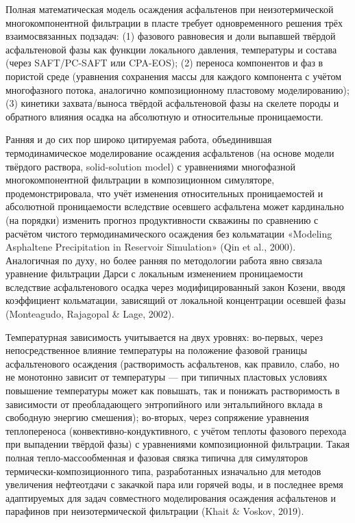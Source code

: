 \documentclass[11pt]{extarticle}
\begin{document}
Полная математическая модель осаждения асфальтенов при неизотермической многокомпонентной фильтрации в пласте требует одновременного решения трёх взаимосвязанных подзадач: (1) фазового равновесия и доли выпавшей твёрдой асфальтеновой фазы как функции локального давления, температуры и состава (через SAFT/PC-SAFT или CPA-EOS); (2) переноса компонентов и фаз в пористой среде (уравнения сохранения массы для каждого компонента с учётом многофазного потока, аналогично композиционному пластовому моделированию); (3) кинетики захвата/выноса твёрдой асфальтеновой фазы на скелете породы и обратного влияния осадка на абсолютную и относительные проницаемости.

Ранняя и до сих пор широко цитируемая работа, объединившая термодинамическое моделирование осаждения асфальтенов (на основе модели твёрдого раствора, solid-solution model) с уравнениями многофазной многокомпонентной фильтрации в композиционном симуляторе, продемонстрировала, что учёт изменения относительных проницаемостей и абсолютной проницаемости вследствие осевшего асфальтена может кардинально (на порядки) изменить прогноз продуктивности скважины по сравнению с расчётом чистого термодинамического осаждения без кольматации «Modeling Asphaltene Precipitation in Reservoir Simulation» (Qin et al., 2000). Аналогичная по духу, но более ранняя по методологии работа явно связала уравнение фильтрации Дарси с локальным изменением проницаемости вследствие асфальтенового осадка через модифицированный закон Козени, вводя коэффициент кольматации, зависящий от локальной концентрации осевшей фазы (Monteagudo, Rajagopal \& Lage, 2002).

Температурная зависимость учитывается на двух уровнях: во-первых, через непосредственное влияние температуры на положение фазовой границы асфальтенового осаждения (растворимость асфальтенов, как правило, слабо, но не монотонно зависит от температуры --- при типичных пластовых условиях повышение температуры может как повышать, так и понижать растворимость в зависимости от преобладающего энтропийного или энтальпийного вклада в свободную энергию смешения); во-вторых, через сопряжение уравнения теплопереноса (конвективно-кондуктивного, с учётом теплоты фазового перехода при выпадении твёрдой фазы) с уравнениями композиционной фильтрации. Такая полная тепло-массообменная и фазовая связка типична для симуляторов термически-композиционного типа, разработанных изначально для методов увеличения нефтеотдачи с закачкой пара или горячей воды, и в последнее время адаптируемых для задач совместного моделирования осаждения асфальтенов и парафинов при неизотермической фильтрации (Khait \& Voskov, 2019).
\end{document}
